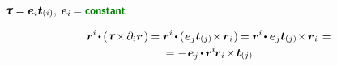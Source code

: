 \begin{otherlanguage}{russian}
\noindent
${\cauchystress = \bm{e}_{i} \tractionvector{i}\hspace{.1ex}}$, ${\bm{e}_i \hspace{-0.2ex} = \boldconstant}$

\nopagebreak\vspace{-0.2em}\begin{multline*}
\currentlocationvector^{i} \hspace{-0.25ex} \dotp \hspace{-0.1ex} \left( \cauchystress \hspace{-0.2ex} \times \hspace{-0.2ex} \partial_i \currentlocationvector \hspace{.25ex} \right) \hspace{-0.1ex}
= \currentlocationvector^{i} \hspace{-0.2ex} \dotp \hspace{-0.1ex} \left( \hspace{.1ex} \bm{e}_{j} \tractionvector{j} \hspace{-0.2ex} \times \hspace{-0.2ex} \currentlocationvector_{\hspace{.1ex}i} \hspace{.1ex} \right) \hspace{-0.15ex}
= \currentlocationvector^{i} \hspace{-0.25ex} \dotp \bm{e}_{j} \tractionvector{j} \hspace{-0.2ex} \times \hspace{-0.2ex} \currentlocationvector_{\hspace{.1ex}i} \hspace{.2ex} =
\\[-0.15em]
= - \hspace{.25ex} \bm{e}_{j} \hspace{-0.15ex} \dotp \hspace{-0.1ex} \currentlocationvector^{i} \hspace{-0.2ex} \currentlocationvector_{\hspace{.1ex}i} \hspace{-0.25ex} \times \hspace{-0.25ex} \tractionvector{j}

\end{multline*}
\end{otherlanguage}
